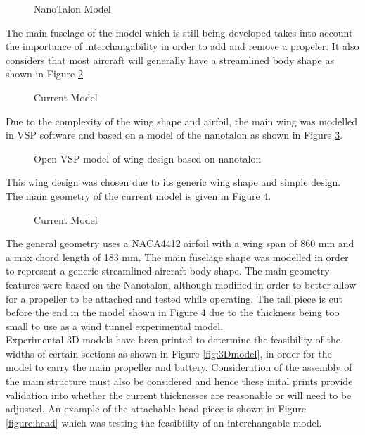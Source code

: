 \begin{figure}[h!]
    \centering
    \caption{NanoTalon Model \cite{nanotalon}}
    \label{fig:nanotalon}
\end{figure}

The main fuselage of the model which is still being developed takes into account the importance of interchangability in order to add and remove a propeler. It also considers that most aircraft will generally have a streamlined body shape as shown in Figure \ref{fig:model}

\begin{figure}[h!]
    \centering
    \caption{Current Model}
    \label{fig:model}
\end{figure}

Due to the complexity of the wing shape and airfoil, the main wing was modelled in VSP software and based on a model of the nanotalon  as shown in Figure \ref{fig:openVSP}. 

\begin{figure}[h!]
    \centering
    \caption{Open VSP model of wing design based on nanotalon \cite{nanotalon}}
    \label{fig:openVSP}
\end{figure}

This wing design was chosen due to its generic wing shape and simple design. The main geometry of the current model is given in Figure \ref{fig:model1}.

\begin{figure}[h!]
    \centering
    \caption{Current Model}
    \label{fig:model1}
\end{figure}


The general geometry uses a NACA4412 airfoil with a wing span of 860 mm and a max chord length of 183 mm. The main fuselage shape was modelled in order to represent a generic streamlined aircraft body shape. The main geometry features were based on the Nanotalon, although modified in order to better allow for a propeller to be attached and tested while operating. The tail piece is cut before the end in the model shown in Figure \ref{fig:model1} due to the thickness being too small to use as a wind tunnel experimental model.\\ 
Experimental 3D models have been printed to determine the feasibility of the widths of certain sections as shown in Figure \ref{fig:3Dmodel}, in order for the model to carry the main propeller and battery. Consideration of the assembly of the main structure must also be considered and hence these inital prints provide validation into whether the current thicknesses are reasonable or will need to be adjusted. An example of the attachable head piece is shown in Figure \ref{figure:head} which was testing the feasibility of an interchangable model. 

